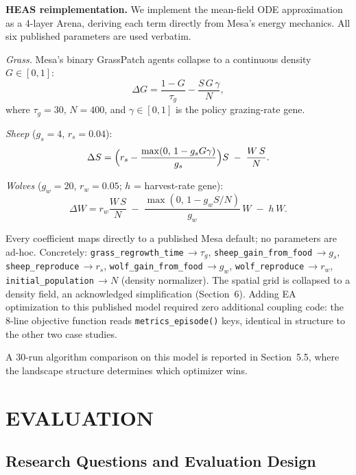 \documentclass{wscpaperproc}
\begin{document}
\textbf{HEAS reimplementation.} We implement the mean-field ODE approximation as a
4-layer Arena, deriving each term directly from Mesa's energy mechanics.
All six published parameters are used verbatim.

\textit{Grass.} Mesa's binary GrassPatch agents collapse to a continuous
density $G\in[0,1]$:
\begin{equation}
  \Delta G = \frac{1-G}{\tau_g} - \frac{S\,G\,\gamma}{N},
  \label{eq:grass}
\end{equation}
where $\tau_g\!=\!30$, $N\!=\!400$, and $\gamma\!\in\![0,1]$ is the policy
grazing-rate gene.

\textit{Sheep} ($g_s\!=\!4$, $r_s\!=\!0.04$):
\begin{equation}
  \Delta S = \Bigl(r_s - \frac{\max(0,\,1-g_s G\gamma)}{g_s}\Bigr)S
             \;-\; \frac{W\,S}{N}.
  \label{eq:sheep}
\end{equation}

\textit{Wolves} ($g_w\!=\!20$, $r_w\!=\!0.05$; $h$ = harvest-rate gene):
\begin{equation}
  \Delta W = r_w \frac{W\,S}{N}
             \;-\; \frac{\max(0,\,1-g_w S/N)}{g_w}\,W
             \;-\; h\,W.
  \label{eq:wolf}
\end{equation}

Every coefficient maps directly to a published Mesa default; no parameters
are ad-hoc. Concretely: \texttt{grass\_regrowth\_time}\,$\to\!\tau_g$,
\texttt{sheep\_gain\_from\_food}\,$\to\!g_s$,
\texttt{sheep\_reproduce}\,$\to\!r_s$,
\texttt{wolf\_gain\_from\_food}\,$\to\!g_w$,
\texttt{wolf\_reproduce}\,$\to\!r_w$,
\texttt{initial\_population}\,$\to\!N$ (density normalizer). The spatial grid
is collapsed to a density field, an acknowledged simplification (Section~6).
Adding EA optimization to this published model required zero additional coupling
code: the 8-line objective function reads \texttt{metrics\_episode()} keys,
identical in structure to the other two case studies.

A 30-run algorithm comparison on this model is reported in Section~5.5,
where the landscape structure determines which optimizer wins.

\section{EVALUATION}

\subsection{Research Questions and Evaluation Design}
\end{document}
